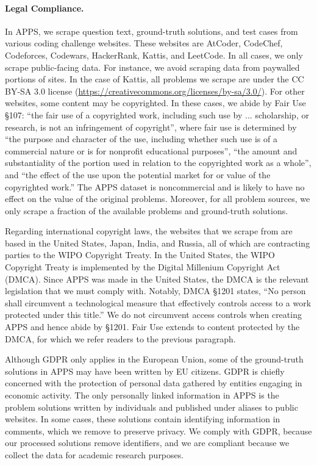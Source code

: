 \paragraph{Legal Compliance.}
In APPS, we scrape question text, ground-truth solutions, and test cases from various coding challenge websites. These websites are AtCoder, CodeChef, Codeforces, Codewars, HackerRank, Kattis, and LeetCode. In all cases, we only scrape public-facing data. For instance, we avoid scraping data from paywalled portions of sites. In the case of Kattis, all problems we scrape are under the CC BY-SA 3.0 license (\href{https://creativecommons.org/licenses/by-sa/3.0/}{https://creativecommons.org/licenses/by-sa/3.0/}). For other websites, some content may be copyrighted. In these cases, we abide by Fair Use §107: ``the fair use of a copyrighted work, including such use by ... scholarship, or research, is not an infringement of copyright'', where fair use is determined by ``the purpose and character of the use, including whether such use is of a commercial nature or is for nonprofit educational purposes'', ``the amount and substantiality of the portion used in relation to the copyrighted work as a whole'', and ``the effect of the use upon the potential market for or value of the copyrighted work.'' The APPS dataset is noncommercial and is likely to have no effect on the value of the original problems. Moreover, for all problem sources, we only scrape a fraction of the available problems and ground-truth solutions.

Regarding international copyright laws, the websites that we scrape from are based in the United States, Japan, India, and Russia, all of which are contracting parties to the WIPO Copyright Treaty. In the United States, the WIPO Copyright Treaty is implemented by the Digital Millenium Copyright Act (DMCA). Since APPS was made in the United States, the DMCA is the relevant legislation that we must comply with. Notably, DMCA §1201 states, ``No person shall circumvent a technological measure that effectively controls access to a work protected under this title.'' We do not circumvent access controls when creating APPS and hence abide by §1201. Fair Use extends to content protected by the DMCA, for which we refer readers to the previous paragraph.

Although GDPR only applies in the European Union, some of the ground-truth solutions in APPS may have been written by EU citizens. GDPR is chiefly concerned with the protection of personal data gathered by entities engaging in economic activity. The only personally linked information in APPS is the problem solutions written by individuals and published under aliases to public websites. In some cases, these solutions contain identifying information in comments, which we remove to preserve privacy. We comply with GDPR, because our processed solutions remove identifiers, and we are compliant because we collect the data for academic research purposes.

